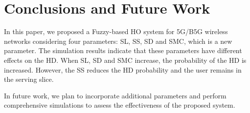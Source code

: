 \documentclass[graybox]{svmult}
\begin{document}
\section{Conclusions and Future Work}\label{sec:conclusions}

In this paper, we proposed a Fuzzy-based HO system for 5G/B5G wireless networks considering four parameters: SL, SS, SD and SMC, which is a new parameter. The simulation results indicate that these parameters have different effects on the HD. When SL, SD and SMC increase, the probability of the HD is increased. However, the SS reduces the HD probability and the user remains in the serving slice.

In future work, we plan to incorporate additional parameters and perform comprehensive simulations to assess the effectiveness of the proposed system.




%
%
%
%

%


\end{document}
